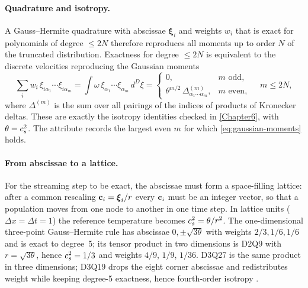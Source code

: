 \paragraph{Quadrature and isotropy.}
A Gauss--Hermite quadrature with abscissae $\boldsymbol{\xi}_i$ and weights $w_i$ that is
exact for polynomials of degree $\le 2N$ therefore reproduces all moments up to order $N$ of
the truncated distribution. Exactness for degree $\le 2N$ is equivalent to the discrete
velocities reproducing the Gaussian moments
\begin{equation}
\sum_i w_i\, \xi_{i\alpha_1}\cdots\xi_{i\alpha_m}
= \int \omega\,\xi_{\alpha_1}\cdots\xi_{\alpha_m}\,d^D\xi
=
\begin{cases}
0, & m \text{ odd},\\
\theta^{m/2}\,\Delta^{(m)}_{\alpha_1\cdots\alpha_m}, & m \text{ even},
\end{cases}
\quad m \le 2N,
\label{eq:gaussian-moments}
\end{equation}
where $\Delta^{(m)}$ is the sum over all pairings of the indices of products of Kronecker
deltas. These are exactly the isotropy identities checked in \cref{Chapter6}, with
$\theta = c_s^2$. The  attribute records the largest even $m$ for
which \cref{eq:gaussian-moments} holds.

\paragraph{From abscissae to a lattice.}
For the streaming step to be exact, the abscissae must form a space-filling lattice: after
a common rescaling $\mathbf{c}_i = \boldsymbol{\xi}_i / r$ every $\mathbf{c}_i$ must be an integer vector,
so that a population moves from one node to another in one time step. In lattice units
($\Delta x = \Delta t = 1$) the reference temperature becomes $c_s^2 = \theta / r^2$. The
one-dimensional three-point Gauss--Hermite rule has abscissae $0,\pm\sqrt{3\theta}$ with
weights $2/3, 1/6, 1/6$ and is exact to degree~5; its tensor product in two dimensions is
D2Q9 with $r = \sqrt{3\theta}$, hence $c_s^2 = 1/3$ and weights $4/9$, $1/9$, $1/36$. D3Q27
is the same product in three dimensions; D3Q19 drops the eight corner abscissae and
redistributes weight while keeping degree-5 exactness, hence fourth-order isotropy
\parencite{QianHumieresLallemand1992,Kruger2017}.

